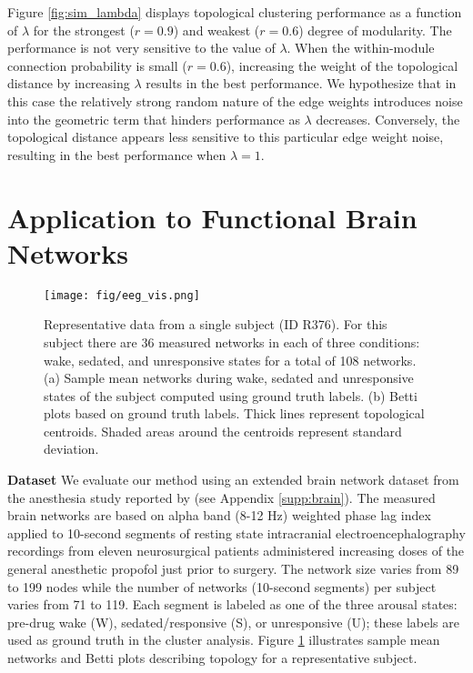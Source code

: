 \documentclass{article} %
\begin{document}
Figure \ref{fig:sim_lambda} displays topological clustering performance as a function of $\lambda$ for the strongest ($r = 0.9$) and weakest ($r = 0.6$) degree of modularity. The performance is not very sensitive to the value of $\lambda$. When the within-module connection probability is small ($r=0.6$),  increasing the weight of the topological distance by increasing $\lambda$ results in the best performance. We hypothesize that in this case the relatively strong random nature of the edge weights introduces noise into the geometric term that hinders performance as $\lambda$ decreases.  Conversely, the topological distance appears less sensitive to this particular edge weight noise, resulting in the best performance when $\lambda = 1$.



\section{Application to Functional Brain Networks}
\label{sec:application}


\begin{figure}
\texttt{[image: fig/eeg\_vis.png]}
\centering
\caption{Representative data from a single subject (ID R376). For this subject there are 36 measured networks in each of three conditions: wake, sedated, and unresponsive states for a total of 108 networks. (a) Sample mean networks during wake, sedated and unresponsive states of the subject computed using ground truth labels. (b) Betti plots based on ground truth labels. Thick lines represent topological centroids. Shaded areas around the centroids represent standard deviation.}
\label{fig:eeg_visualization}
\end{figure}


\textbf{Dataset}
We evaluate our method using an extended brain network dataset from the anesthesia study reported by \citet{banks2020cortical} (see Appendix \ref{supp:brain}). The measured brain networks are based on alpha band (8-12 Hz) weighted phase lag index \citep{vinck2011improved} applied to 10-second segments of resting state intracranial electroencephalography recordings from eleven neurosurgical patients administered increasing doses of the general anesthetic propofol just prior to surgery. The network size varies from 89 to 199 nodes while the number of networks (10-second segments) per subject varies from 71 to 119. Each segment is labeled as one of the three arousal states: pre-drug wake (W), sedated/responsive (S), or unresponsive (U); these labels are used as ground truth in the cluster analysis. Figure \ref{fig:eeg_visualization} illustrates sample mean networks and Betti plots describing topology for a representative subject.
\end{document}
